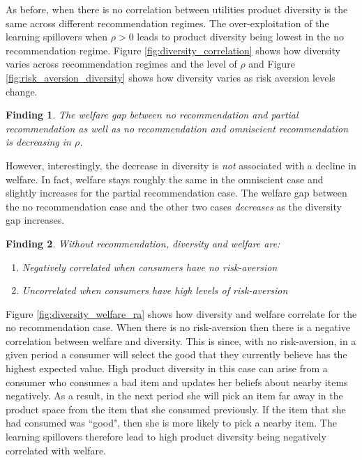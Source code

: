 \documentclass[sigconf]{acmart}
\newtheorem{finding}{Finding}
\begin{document}
As before, when there is no correlation between utilities product diversity is the same across different recommendation regimes. The over-exploitation of the learning spillovers when $\rho > 0$ leads to product diversity being lowest in the no recommendation regime. Figure \ref{fig:diversity_correlation} shows how diversity varies across recommendation regimes and the level of $\rho$ and Figure \ref{fig:risk_aversion_diversity} shows how diversity varies as risk aversion levels change. 

\begin{finding}\label{finding_welfare_gap}
The welfare gap between no recommendation and partial recommendation as well as no recommendation and omniscient recommendation is decreasing in $\rho$.
\end{finding}
However, interestingly, the decrease in diversity is \textit{not} associated with a decline in welfare. In fact, welfare stays roughly the same in the omniscient case and slightly increases for the partial recommendation case. The welfare gap between the no recommendation case and the other two cases \textit{decreases} as the diversity gap increases.

\begin{finding}\label{finding_diversity_welfare_corr}
Without recommendation, diversity and welfare are:
\begin{enumerate}
\item Negatively correlated when consumers have no risk-aversion
\item Uncorrelated when consumers have high levels of risk-aversion
\end{enumerate}
\end{finding}

Figure \ref{fig:diversity_welfare_ra} shows how diversity and welfare correlate for the no recommendation case. When there is no risk-aversion then there is a negative correlation between welfare and diversity. This is since, with no risk-aversion, in a given period a consumer will select the good that they currently believe has the highest expected value. High product diversity in this case can arise from a consumer who consumes a bad item and updates her beliefs about nearby items negatively. As a result, in the next period she will pick an item far away in the product space from the item that she consumed previously. If the item that she had consumed was ``good", then she is more likely to pick a nearby item. The learning spillovers therefore lead to high product diversity being negatively correlated with welfare.
\end{document}
